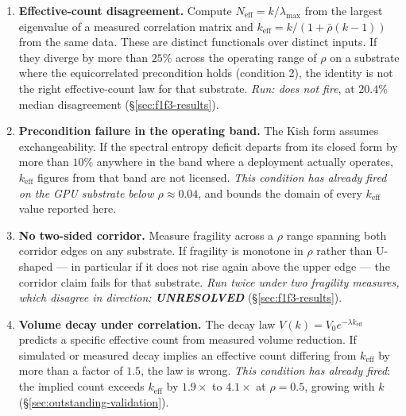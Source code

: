 \documentclass[11pt,a4paper]{article}
\theoremstyle{definition}
\theoremstyle{remark}
\newcommand{\keff}{k_{\text{eff}}}
\begin{document}
\begin{enumerate}[noitemsep]
    \item \textbf{Effective-count disagreement.} Compute $N_{\text{eff}} = k/\lambda_{\max}$ from the largest eigenvalue of a measured correlation matrix and $\keff = k/(1+\bar\rho(k-1))$ from the same data. These are distinct functionals over distinct inputs. If they diverge by more than $25\%$ across the operating range of $\rho$ on a substrate where the equicorrelated precondition holds (condition 2), the identity is not the right effective-count law for that substrate. \emph{Run: does not fire}, at $20.4\%$ median disagreement (\S\ref{sec:f1f3-results}).
    \item \textbf{Precondition failure in the operating band.} The Kish form assumes exchangeability. If the spectral entropy deficit departs from its closed form by more than $10\%$ anywhere in the band where a deployment actually operates, $\keff$ figures from that band are not licensed. \emph{This condition has already fired on the GPU substrate below $\rho \approx 0.04$}, and bounds the domain of every $\keff$ value reported here.
    \item \textbf{No two-sided corridor.} Measure fragility across a $\rho$ range spanning both corridor edges on any substrate. If fragility is monotone in $\rho$ rather than U-shaped --- in particular if it does not rise again above the upper edge --- the corridor claim fails for that substrate. \emph{Run twice under two fragility measures, which disagree in direction: \textbf{UNRESOLVED}} (\S\ref{sec:f1f3-results}).
    \item \textbf{Volume decay under correlation.} The decay law $V(k) = V_0 e^{-\lambda \keff}$ predicts a specific effective count from measured volume reduction. If simulated or measured decay implies an effective count differing from $\keff$ by more than a factor of $1.5$, the law is wrong. \emph{This condition has already fired}: the implied count exceeds $\keff$ by $1.9\times$ to $4.1\times$ at $\rho = 0.5$, growing with $k$ (\S\ref{sec:outstanding-validation}).


\end{enumerate}
\end{document}
